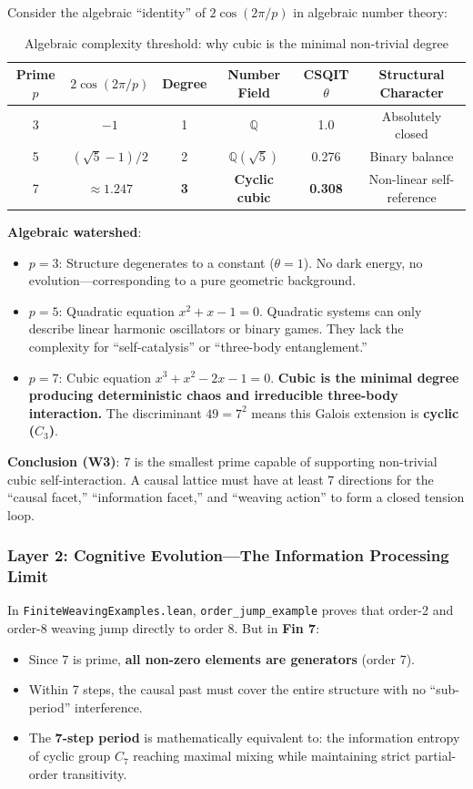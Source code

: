 \documentclass[aps,prd,twocolumn,nofootinbib,floatfix]{revtex4-2}
\begin{document}
Consider the algebraic ``identity'' of $2\cos(2\pi/p)$ in algebraic number theory:

\begin{table}[h]
\centering
\begin{tabular}{cccccc}
\hline
Prime $p$ & $2\cos(2\pi/p)$ & Degree & Number Field & CSQIT $\theta$ & Structural Character \\
\hline
3 & $-1$ & 1 & $\mathbb{Q}$ & 1.0 & Absolutely closed \\
5 & $(\sqrt{5}-1)/2$ & 2 & $\mathbb{Q}(\sqrt{5})$ & 0.276 & Binary balance \\
7 & $\approx 1.247$ & \textbf{3} & \textbf{Cyclic cubic} & \textbf{0.308} & Non-linear self-reference \\
\hline
\end{tabular}
\caption{Algebraic complexity threshold: why cubic is the minimal non-trivial degree}
\label{tab:algebraic}
\end{table}

\textbf{Algebraic watershed}:
\begin{itemize}
    \item \textbf{$p=3$}: Structure degenerates to a constant ($\theta=1$). No dark energy, no evolution---corresponding to a pure geometric background.
    \item \textbf{$p=5$}: Quadratic equation $x^2 + x - 1 = 0$. Quadratic systems can only describe linear harmonic oscillators or binary games. They lack the complexity for ``self-catalysis'' or ``three-body entanglement.''
    \item \textbf{$p=7$}: Cubic equation $x^3 + x^2 - 2x - 1 = 0$. \textbf{Cubic is the minimal degree producing deterministic chaos and irreducible three-body interaction.} The discriminant $49 = 7^2$ means this Galois extension is \textbf{cyclic ($C_3$)}.
\end{itemize}

\textbf{Conclusion (W3)}: 7 is the smallest prime capable of supporting non-trivial cubic self-interaction. A causal lattice must have at least 7 directions for the ``causal facet,'' ``information facet,'' and ``weaving action'' to form a closed tension loop.

\subsubsection{Layer 2: Cognitive Evolution---The Information Processing Limit}

In \texttt{FiniteWeavingExamples.lean}, \texttt{order\_jump\_example} proves that order-2 and order-8 weaving jump directly to order 8. But in \textbf{Fin 7}:
\begin{itemize}
    \item Since 7 is prime, \textbf{all non-zero elements are generators} (order 7).
    \item Within 7 steps, the causal past must cover the entire structure with no ``sub-period'' interference.
    \item The \textbf{7-step period} is mathematically equivalent to: the information entropy of cyclic group $C_7$ reaching maximal mixing while maintaining strict partial-order transitivity.
\end{itemize}
\end{document}
